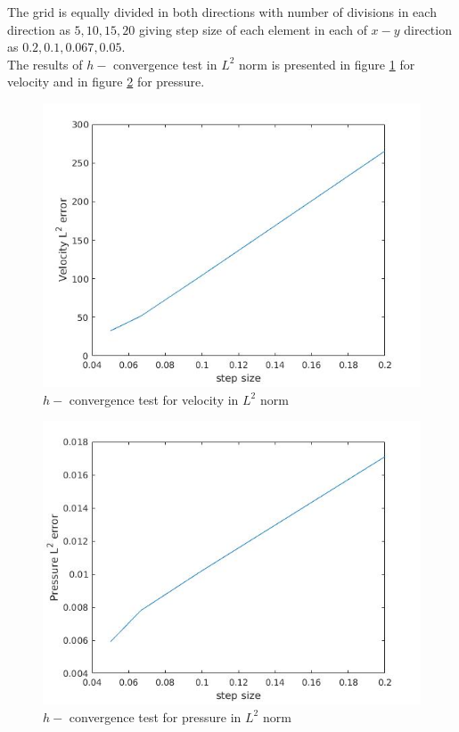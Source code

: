 \documentclass[a4paper,12pt]{book}
\begin{document}
The grid is equally divided in both directions with number of divisions in each direction as $5,10,15,20$ giving step size of each element in each of $x-y$ direction as $0.2,0.1,0.067,0.05$.\\

The results of $h-$ convergence test in $L^2$ norm is presented in figure \ref{fig:vel_stoke_conv} for velocity and in figure \ref{fig:pre_stoke_conv} for pressure. \\

\begin{figure}
  \includegraphics[width=\linewidth]{velocity_error_stokes.jpg}
  \caption{$h-$ convergence test for velocity in $L^2$ norm}
  \label{fig:vel_stoke_conv}
\end{figure}

\begin{figure}
  \includegraphics[width=\linewidth]{pressure_error_stokes.jpg}
  \caption{$h-$ convergence test for pressure in $L^2$ norm}
  \label{fig:pre_stoke_conv}
\end{figure}
\end{document}
